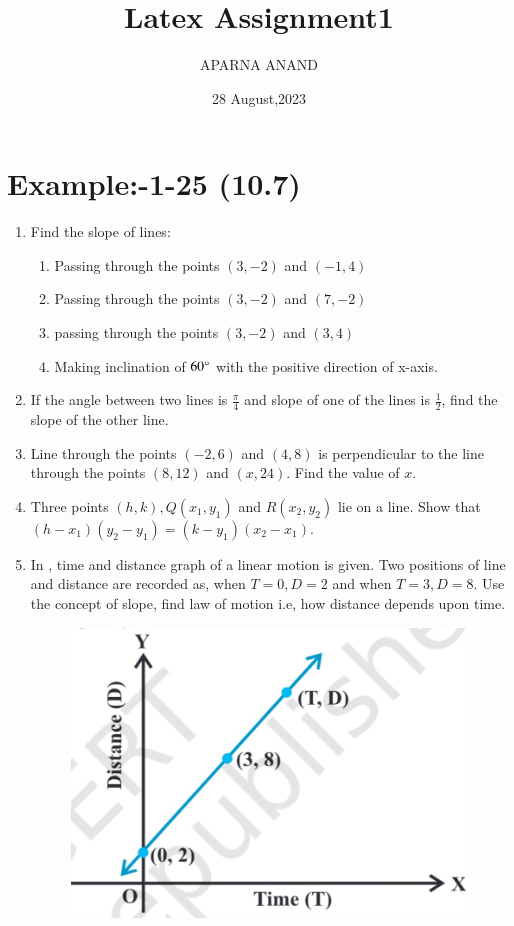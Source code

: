 \documentclass{article}
\theoremstyle{remark}
\begin{document}
\title{Latex Assignment1}
\author{APARNA ANAND}
\date{28 August,2023}
\maketitle
\section*{Example:-1-25 (10.7)}
\begin{enumerate}
\item Find the slope of lines:
\begin{enumerate}
\item  Passing through the points $(3,-2)$ and $(-1,4)$
\item  Passing through the points $(3,-2)$ and $(7,-2)$
\item  passing through the points $(3,-2)$ and $(3,4)$	
\item  Making inclination of $60\degree$ with the positive direction of x-axis.
\end{enumerate}
\item If the angle between two lines is $\frac{\pi}{4}$ and slope of one of the lines is $\frac{1}{2}$, find the slope of the other line.
\item Line through the points $(-2,6)$ and $(4,8)$ is perpendicular to the line through the points $(8,12)$ and $(x,24)$. Find the value of $x$.
\item Three points $(h,k), Q(x_1,y_1)$ and $R(x_2,y_2)$ lie on a line. Show that $(h-x_1)(y_2-y_1)=(k-y_1)(x_2-x_1)$.
\item In , time and distance graph of a linear motion is given. Two positions of line and distance are recorded as, when $T=0,D=2$ and when $T=3,D=8$. Use the concept of slope, find law of motion i.e, how distance depends upon time.
\begin{figure}[h]
\centering
\includegraphics[width=\columnwidth]{figs/10.9.png}

\end{figure}
\end{enumerate}
\end{document}
